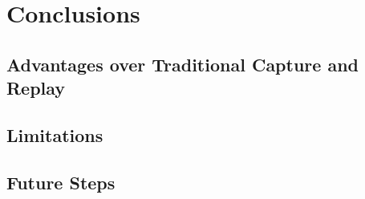 \chapter{Conclusions}
\section{Advantages over Traditional Capture and Replay}
\section {Limitations}
\section{Future Steps}


